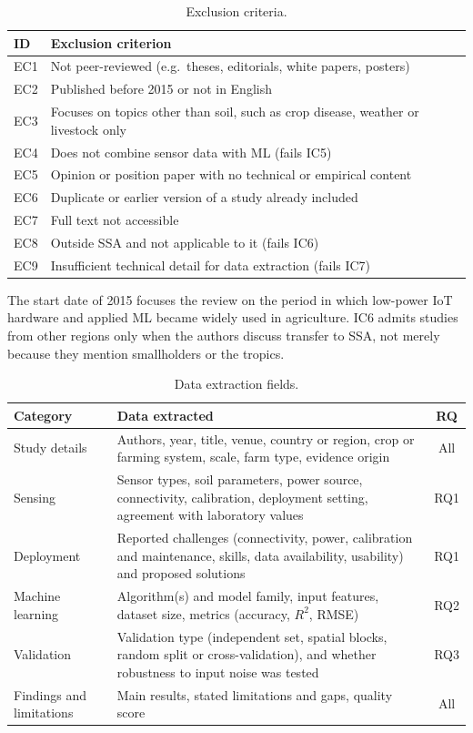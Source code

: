 \documentclass[conference]{IEEEtran}
\begin{document}
\begin{table}[t]
\caption{Exclusion criteria.}
\label{tab:exclude}
\centering
\footnotesize
\begin{tabular}{@{}p{0.75cm}p{6.9cm}@{}}
\toprule
ID & Exclusion criterion\\
\midrule
EC1 & Not peer-reviewed (e.g.\ theses, editorials, white papers, posters)\\
EC2 & Published before 2015 or not in English\\
EC3 & Focuses on topics other than soil, such as crop disease, weather or livestock only\\
EC4 & Does not combine sensor data with ML (fails IC5)\\
EC5 & Opinion or position paper with no technical or empirical content\\
EC6 & Duplicate or earlier version of a study already included\\
EC7 & Full text not accessible\\
EC8 & Outside SSA and not applicable to it (fails IC6)\\
EC9 & Insufficient technical detail for data extraction (fails IC7)\\
\bottomrule
\end{tabular}
\end{table}

The start date of 2015 focuses the review on the period in which low-power IoT
hardware and applied ML became widely used in agriculture. IC6 admits studies
from other regions only when the authors discuss transfer to SSA, not merely
because they mention smallholders or the tropics.

\begin{table}[t]
\caption{Data extraction fields.}
\label{tab:fields}
\centering
\footnotesize
\begin{tabular}{@{}p{1.5cm}p{4.9cm}c@{}}
\toprule
Category & Data extracted & RQ\\
\midrule
Study details & Authors, year, title, venue, country or region, crop or farming system, scale, farm type, evidence origin & All\\
Sensing & Sensor types, soil parameters, power source, connectivity, calibration, deployment setting, agreement with laboratory values & RQ1\\
Deployment & Reported challenges (connectivity, power, calibration and maintenance, skills, data availability, usability) and proposed solutions & RQ1\\
Machine learning & Algorithm(s) and model family, input features, dataset size, metrics (accuracy, $R^2$, RMSE) & RQ2\\
Validation & Validation type (independent set, spatial blocks, random split or cross-validation), and whether robustness to input noise was tested & RQ3\\
Findings and limitations & Main results, stated limitations and gaps, quality score & All\\
\bottomrule
\end{tabular}
\end{table}
\end{document}
